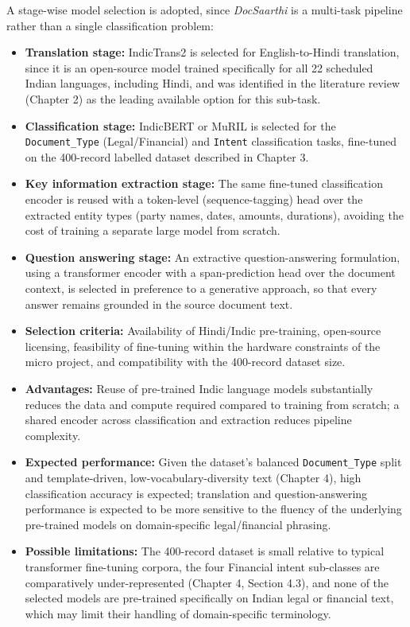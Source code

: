 A stage-wise model selection is adopted, since \textit{DocSaarthi} is a multi-task pipeline rather than a single classification problem:

\begin{itemize}
    \item \textbf{Translation stage:} IndicTrans2 \cite{gala2023indictrans2} is selected for English-to-Hindi translation, since it is an open-source model trained specifically for all 22 scheduled Indian languages, including Hindi, and was identified in the literature review (Chapter 2) as the leading available option for this sub-task.
    \item \textbf{Classification stage:} IndicBERT or MuRIL \cite{khanuja2021muril} is selected for the \texttt{Document\_Type} (Legal/Financial) and \texttt{Intent} classification tasks, fine-tuned on the 400-record labelled dataset described in Chapter 3.
    \item \textbf{Key information extraction stage:} The same fine-tuned classification encoder is reused with a token-level (sequence-tagging) head over the extracted entity types (party names, dates, amounts, durations), avoiding the cost of training a separate large model from scratch.
    \item \textbf{Question answering stage:} An extractive question-answering formulation, using a transformer encoder with a span-prediction head over the document context, is selected in preference to a generative approach, so that every answer remains grounded in the source document text.
    \item \textbf{Selection criteria:} Availability of Hindi/Indic pre-training, open-source licensing, feasibility of fine-tuning within the hardware constraints of the micro project, and compatibility with the 400-record dataset size.
    \item \textbf{Advantages:} Reuse of pre-trained Indic language models substantially reduces the data and compute required compared to training from scratch; a shared encoder across classification and extraction reduces pipeline complexity.
    \item \textbf{Expected performance:} Given the dataset's balanced \texttt{Document\_Type} split and template-driven, low-vocabulary-diversity text (Chapter 4), high classification accuracy is expected; translation and question-answering performance is expected to be more sensitive to the fluency of the underlying pre-trained models on domain-specific legal/financial phrasing.
    \item \textbf{Possible limitations:} The 400-record dataset is small relative to typical transformer fine-tuning corpora, the four Financial intent sub-classes are comparatively under-represented (Chapter 4, Section 4.3), and none of the selected models are pre-trained specifically on Indian legal or financial text, which may limit their handling of domain-specific terminology.
\end{itemize}

